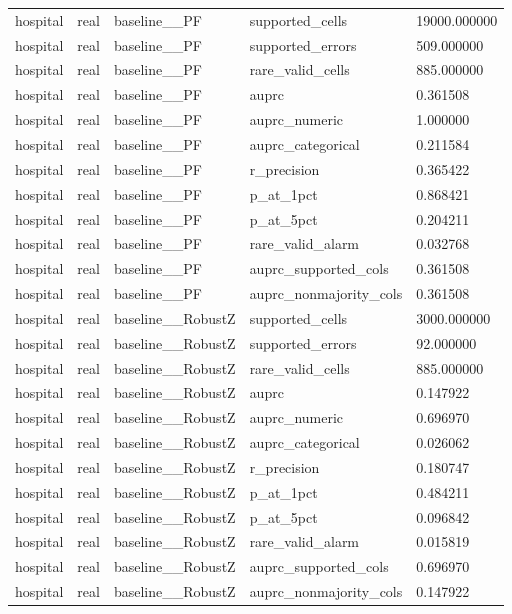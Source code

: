 \begin{tabular}{lllll}
hospital & real & baseline\_\_PF & supported\_cells & 19000.000000 \\
hospital & real & baseline\_\_PF & supported\_errors & 509.000000 \\
hospital & real & baseline\_\_PF & rare\_valid\_cells & 885.000000 \\
hospital & real & baseline\_\_PF & auprc & 0.361508 \\
hospital & real & baseline\_\_PF & auprc\_numeric & 1.000000 \\
hospital & real & baseline\_\_PF & auprc\_categorical & 0.211584 \\
hospital & real & baseline\_\_PF & r\_precision & 0.365422 \\
hospital & real & baseline\_\_PF & p\_at\_1pct & 0.868421 \\
hospital & real & baseline\_\_PF & p\_at\_5pct & 0.204211 \\
hospital & real & baseline\_\_PF & rare\_valid\_alarm & 0.032768 \\
hospital & real & baseline\_\_PF & auprc\_supported\_cols & 0.361508 \\
hospital & real & baseline\_\_PF & auprc\_nonmajority\_cols & 0.361508 \\
hospital & real & baseline\_\_RobustZ & supported\_cells & 3000.000000 \\
hospital & real & baseline\_\_RobustZ & supported\_errors & 92.000000 \\
hospital & real & baseline\_\_RobustZ & rare\_valid\_cells & 885.000000 \\
hospital & real & baseline\_\_RobustZ & auprc & 0.147922 \\
hospital & real & baseline\_\_RobustZ & auprc\_numeric & 0.696970 \\
hospital & real & baseline\_\_RobustZ & auprc\_categorical & 0.026062 \\
hospital & real & baseline\_\_RobustZ & r\_precision & 0.180747 \\
hospital & real & baseline\_\_RobustZ & p\_at\_1pct & 0.484211 \\
hospital & real & baseline\_\_RobustZ & p\_at\_5pct & 0.096842 \\
hospital & real & baseline\_\_RobustZ & rare\_valid\_alarm & 0.015819 \\
hospital & real & baseline\_\_RobustZ & auprc\_supported\_cols & 0.696970 \\
hospital & real & baseline\_\_RobustZ & auprc\_nonmajority\_cols & 0.147922 \\

\end{tabular}
